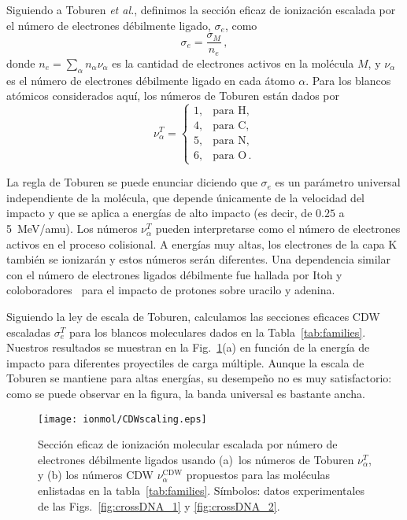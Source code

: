 Siguiendo a Toburen \textit{et al.}, definimos la sección eficaz de 
ionización escalada por el número de electrones débilmente ligado, 
$\sigma_e$, como
\begin{equation}
\sigma_e=\frac{\sigma_M}{n_e}\,, 
\label{eq:cross-ne} 
\end{equation}
donde $n_e=\sum_{\alpha}n_{\alpha}\nu_{\alpha}$ es la cantidad de 
electrones activos en la molécula $M$, y $\nu_{\alpha}$ es el número de 
electrones débilmente ligado en cada átomo $\alpha$. Para los blancos 
atómicos considerados aquí, los números de Toburen están dados por 
\begin{equation}
\nu_{\alpha}^T=\left\{ 
\begin{array}{ll}
1, & \text{para H,} \\
4, & \text{para C,} \\ 
5, & \text{para N,} \\ 
6, & \text{para O}\,.
\end{array}\right.
\label{eq:neToburen} 
\end{equation} 

La regla de Toburen se puede enunciar diciendo que $\sigma_{e}$ es un 
parámetro universal independiente de la molécula, que depende únicamente 
de la velocidad del impacto y que se aplica a energías de alto impacto 
(es decir, de $0.25$ a 5~MeV/amu). Los números $\nu_{\alpha}^T$ pueden 
interpretarse como el número de electrones activos en el proceso 
colisional. A energías muy altas, los electrones de la capa K también se 
ionizarán y estos números serán diferentes. Una dependencia similar con 
el número de electrones ligados débilmente fue hallada por Itoh y 
coloboradores~\cite{itoh2013} para el impacto de protones sobre uracilo 
y adenina.

Siguiendo la ley de escala de Toburen, calculamos las secciones eficaces 
CDW escaladas $\sigma_{e}^T$ para los blancos moleculares dados en la 
Tabla~\ref{tab:families}. Nuestros resultados se muestran en la 
Fig.~\ref{fig:newscaling}(a) en función de la energía de impacto para 
diferentes proyectiles de carga múltiple. Aunque la escala de Toburen se 
mantiene para altas energías, su desempeño no es muy satisfactorio: como 
se puede observar en la figura, la banda universal es bastante ancha.

\begin{figure}[t]
\centering
\texttt{[image: ionmol/CDWscaling.eps]}
\caption[Sección eficaz de ionización molecular escalada por $n_e$.]
{Sección eficaz de ionización molecular escalada por número de electrones 
débilmente ligados usando (a)~los números de Toburen $\nu_{\alpha}^T$, y 
(b) los números CDW $\nu_{\alpha}^{\text{CDW}}$ propuestos para las 
moléculas enlistadas en la tabla~\ref{tab:families}. Símbolos: 
datos experimentales de las Figs.~\ref{fig:crossDNA_1} y 
\ref{fig:crossDNA_2}.}
\label{fig:newscaling}
\end{figure}

